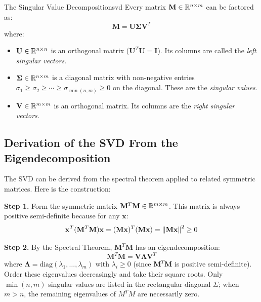 \begin{theorem}{The Singular Value Decomposition}{svd}
Every matrix $\mathbf{M} \in \mathbb{R}^{n \times m}$ can be factored as:
\begin{equation}
    \mathbf{M} = \mathbf{U} \boldsymbol{\Sigma} \mathbf{V}^T
\end{equation}
where:
\begin{itemize}
    \item $\mathbf{U} \in \mathbb{R}^{n \times n}$ is an orthogonal matrix ($\mathbf{U}^T\mathbf{U} = \mathbf{I}$). Its columns are called the \emph{left singular vectors}.
    \item $\boldsymbol{\Sigma} \in \mathbb{R}^{n \times m}$ is a diagonal matrix with non-negative entries $\sigma_1 \geq \sigma_2 \geq \cdots \geq \sigma_{\min(n,m)} \geq 0$ on the diagonal. These are the \emph{singular values}.
    \item $\mathbf{V} \in \mathbb{R}^{m \times m}$ is an orthogonal matrix. Its columns are the \emph{right singular vectors}.
\end{itemize}
\end{theorem}

\subsection{Derivation of the SVD From the Eigendecomposition}
\label{subsec:svd_derivation}

The SVD can be derived from the spectral theorem applied to related symmetric matrices. Here is the construction:

\textbf{Step 1.} Form the symmetric matrix $\mathbf{M}^T\mathbf{M} \in \mathbb{R}^{m \times m}$. This matrix is always positive semi-definite because for any $\mathbf{x}$:
\begin{equation}
    \mathbf{x}^T (\mathbf{M}^T\mathbf{M}) \mathbf{x} = (\mathbf{M}\mathbf{x})^T (\mathbf{M}\mathbf{x}) = \left\lVert \mathbf{M}\mathbf{x} \right\rVert^2 \geq 0
\end{equation}

\textbf{Step 2.} By the Spectral Theorem, $\mathbf{M}^T\mathbf{M}$ has an eigendecomposition:
\begin{equation}
    \mathbf{M}^T\mathbf{M} = \mathbf{V} \boldsymbol{\Lambda} \mathbf{V}^T
\end{equation}
where $\boldsymbol{\Lambda} = \text{diag}(\lambda_1, \ldots, \lambda_m)$ with $\lambda_i \geq 0$ (since $\mathbf{M}^T\mathbf{M}$ is positive semi-definite). Order these eigenvalues decreasingly and take their square roots. Only $\min(n,m)$ singular values are listed in the rectangular diagonal $\Sigma$; when $m>n$, the remaining eigenvalues of $M^TM$ are necessarily zero.

